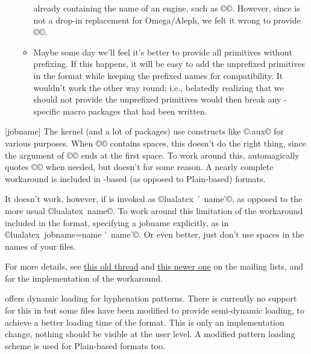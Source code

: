 \documentclass{lltxdoc}
\begin{document}
\begin{myquote}
\begin{enumerate}
\begin{itemize}
          already containing the name of an engine, such as
          ©\luatexOmegaVersion©.  However, since \luatex is not a drop-in
          replacement for Omega/Aleph, we felt it wrong to provide
          ©\OmegaVersion©.
        \item Maybe some day we'll feel it's better to provide all primitives
          without prefixing. If this happens, it will be easy to add the
          unprefixed primitives in the format while keeping the prefixed names
          for compatibility. It wouldn't work the other way round; i.e.,
          belatedly realizing that we should not provide the unprefixed
          primitives would then break any \luatex-specific macro packages
          that had been written.
      \end{itemize}
  \end{enumerate}
\end{myquote}

[jobname]
The \latex kernel (and a lot of packages) use constructs like
©\jobname.aux© for various purposes. When ©\jobname© contains spaces,
this doesn't do the right thing, since the argument of ©© ends at the
first space. To work around this, \pdftex automagically quotes ©\jobname© when
needed, but \luatex doesn't for some reason. A nearly complete workaround is
included in \latex-based (as opposed to Plain-based) \luatex formats.

It doesn't work, however, if \luatex is invoked as ©lualatex ' name'©,
as opposed to the more usual ©lualatex name©. To work around this
limitation of the workaround included in the format, specifying a jobname
explicitly, as in ©lualatex jobname=name ' name'©. Or even better, just
don't use spaces in the names of your \tex files.

For more details, see
\href{http://www.ntg.nl/pipermail/dev-luatex/2009-April/002549.html}{this old
  thread} and
\href{http://tug.org/pipermail/luatex/2010-August/001986.html}{this newer one}
on the \luatex mailing lists, and  for the
implementation of the workaround.

\luatex offers dynamic loading for hyphenation patterns. There is currently no
support for this in  but some files have been modified to provide
semi-dynamic loading, to achieve a better loading time of the format. This is
only an implementation change, nothing should be visible at the user level.
A modified pattern loading scheme is used for Plain-based formats too.
\end{document}
